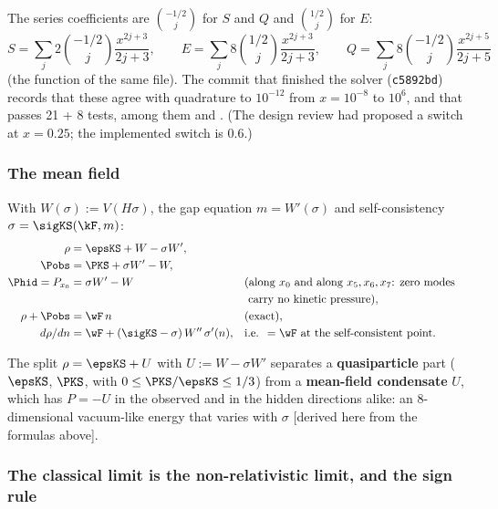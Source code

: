 The series coefficients are $\binom{-1/2}{j}$ for $S$ and $Q$ and $\binom{1/2}{j}$ for $E$:
\[
  S=\sum_j 2\binom{-1/2}{j}\frac{x^{2j+3}}{2j+3},\qquad
  E=\sum_j 8\binom{1/2}{j}\frac{x^{2j+3}}{2j+3},\qquad
  Q=\sum_j 8\binom{-1/2}{j}\frac{x^{2j+5}}{2j+5}
\]
(the  function of the same file). The commit that finished the solver
(\texttt{c5892bd}) records that these agree with quadrature to $10^{-12}$ from $x=10^{-8}$ to $10^{6}$,
and that  passes 21 + 8 tests, among them
 and
. (The design
review had proposed a switch at $x=0.25$; the implemented switch is $0.6$.)

\subsubsection{The mean field}
\label{sec:3.7.6}

With $W(\sigma):=V(H\sigma)$, the gap equation $m=W'(\sigma)$ and self-consistency
$\sigma=\sigKS(\kF,m)$:
\begin{align*}
  \rho&=\epsKS+W-\sigma W',\\
  \Pobs&=\PKS+\sigma W'-W,\\
  \Phid=P_{x_0}&=\sigma W'-W &&\text{(along } x_0 \text{ and along } x_5,x_6,x_7\text{: zero modes}\\
  & &&\ \text{carry no kinetic pressure)},\\
  \rho+\Pobs&=\wF\,n &&\text{(exact)},\\
  d\rho/dn&=\wF+(\sigKS-\sigma)\,W''\,\sigma'(n), &&\text{i.e. } =\wF \text{ at the self-consistent point}.
\end{align*}
 

The split $\rho=\epsKS+U$ with $U:=W-\sigma W'$ separates a \textbf{quasiparticle} part ($\epsKS$,
$\PKS$, with $0\leq\PKS/\epsKS\leq1/3$) from a \textbf{mean-field condensate} $U$, which has $P=-U$ in
the observed and in the hidden directions alike: an 8-dimensional vacuum-like energy that varies with
$\sigma$ [derived here from the formulas above].

\subsubsection{The classical limit is the non-relativistic limit, and the sign rule}
\label{sec:3.7.7}

